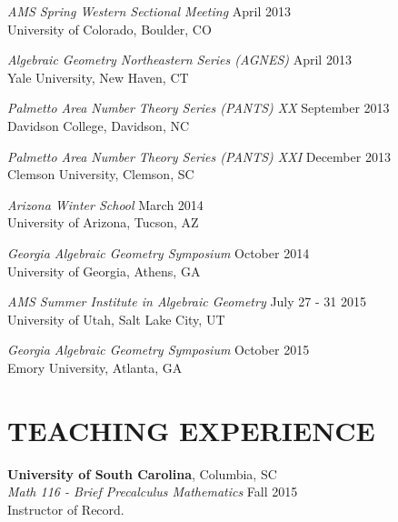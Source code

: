 \documentclass[line,margin]{res}
\begin{document}
\begin{resume}
                          {\sl AMS Spring Western Sectional Meeting} \hfill April 2013\\
                          University of Colorado, Boulder, CO
                          
                          {\sl Algebraic Geometry Northeastern Series (AGNES)} \hfill April 2013\\
                          Yale University, New Haven, CT

                          \newpage
                          
                          {\sl Palmetto Area Number Theory Series (PANTS) XX} \hfill September 2013\\
                          Davidson College, Davidson, NC
                          
                          {\sl Palmetto Area Number Theory Series (PANTS) XXI} \hfill December 2013\\
                          Clemson University, Clemson, SC

                          {\sl Arizona Winter School} \hfill March 2014\\
                          University of Arizona, Tucson, AZ
                          
                          {\sl Georgia Algebraic Geometry Symposium} \hfill October 2014\\
                          University of Georgia, Athens, GA

                          {\sl AMS Summer Institute in Algebraic Geometry} \hfill July 27 - 31 2015\\
                          University of Utah, Salt Lake City, UT

                          {\sl Georgia Algebraic Geometry Symposium} \hfill October 2015\\
                          Emory University, Atlanta, GA

                          \section{TEACHING EXPERIENCE}
                                  {\bf University of South Carolina}, Columbia, SC\\
                          {\sl Math 116 - Brief Precalculus Mathematics} \hfill Fall 2015\\
                          Instructor of Record.


\end{resume}
\end{document}
